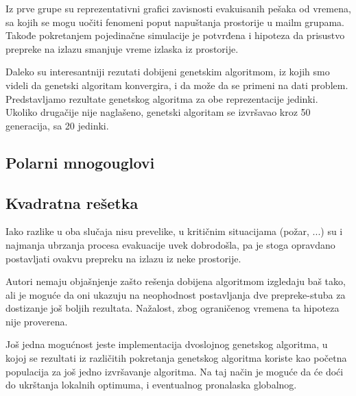 \documentclass[12pt]{article}
\begin{document}
Iz  prve grupe su reprezentativni grafici zavisnosti evakuisanih pešaka od vremena, sa kojih se mogu uočiti fenomeni poput napuštanja prostorije u mailm grupama. Takođe pokretanjem pojedinačne simulacije je potvrđena i hipoteza da prisustvo prepreke na izlazu smanjuje vreme izlaska iz prostorije.


Daleko su interesantniji rezutati dobijeni genetskim algoritmom, iz kojih smo videli da genetski algoritam konvergira, i da može da se primeni na dati problem. Predstavljamo rezultate genetskog algoritma za obe reprezentacije jedinki. Ukoliko drugačije nije naglašeno, genetski algoritam se izvršavao kroz 50 generacija, sa 20 jedinki.


\subsection*{Polarni mnogouglovi}


\subsection*{Kvadratna rešetka} 


Iako razlike u oba slučaja nisu prevelike, u kritičnim situacijama (požar, ...) su i najmanja ubrzanja procesa evakuacije uvek dobrodošla, pa je stoga opravdano postavljati ovakvu prepreku na izlazu iz neke prostorije.

Autori nemaju objašnjenje zašto rešenja dobijena algoritmom izgledaju baš tako, ali je moguće da oni ukazuju na neophodnost postavljanja dve prepreke-stuba za dostizanje još boljih rezultata. Nažalost, zbog ograničenog vremena ta hipoteza nije proverena.

Još jedna mogućnost jeste implementacija dvoslojnog genetskog algoritma, u kojoj se rezultati iz različitih pokretanja genetskog algoritma koriste kao početna populacija za još jedno izvršavanje algoritma. Na taj način je moguće da će doći do ukrštanja lokalnih optimuma, i eventualnog pronalaska globalnog.
\end{document}
